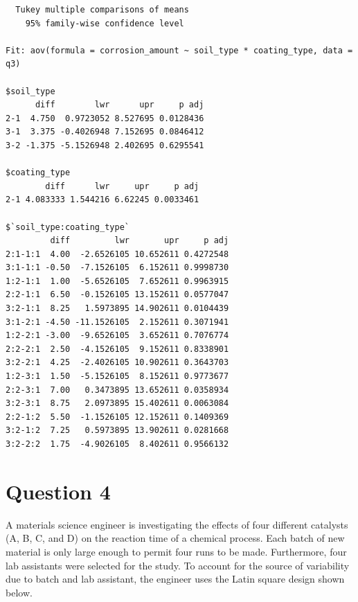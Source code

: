 \documentclass[
  a4paper]{article}
\begin{document}
\begin{verbatim}
  Tukey multiple comparisons of means
    95% family-wise confidence level

Fit: aov(formula = corrosion_amount ~ soil_type * coating_type, data = q3)

$soil_type
      diff        lwr      upr     p adj
2-1  4.750  0.9723052 8.527695 0.0128436
3-1  3.375 -0.4026948 7.152695 0.0846412
3-2 -1.375 -5.1526948 2.402695 0.6295541

$coating_type
        diff      lwr     upr     p adj
2-1 4.083333 1.544216 6.62245 0.0033461

$`soil_type:coating_type`
         diff         lwr       upr     p adj
2:1-1:1  4.00  -2.6526105 10.652611 0.4272548
3:1-1:1 -0.50  -7.1526105  6.152611 0.9998730
1:2-1:1  1.00  -5.6526105  7.652611 0.9963915
2:2-1:1  6.50  -0.1526105 13.152611 0.0577047
3:2-1:1  8.25   1.5973895 14.902611 0.0104439
3:1-2:1 -4.50 -11.1526105  2.152611 0.3071941
1:2-2:1 -3.00  -9.6526105  3.652611 0.7076774
2:2-2:1  2.50  -4.1526105  9.152611 0.8338901
3:2-2:1  4.25  -2.4026105 10.902611 0.3643703
1:2-3:1  1.50  -5.1526105  8.152611 0.9773677
2:2-3:1  7.00   0.3473895 13.652611 0.0358934
3:2-3:1  8.75   2.0973895 15.402611 0.0063084
2:2-1:2  5.50  -1.1526105 12.152611 0.1409369
3:2-1:2  7.25   0.5973895 13.902611 0.0281668
3:2-2:2  1.75  -4.9026105  8.402611 0.9566132
\end{verbatim}

\section{Question 4}\label{question-4}

A materials science engineer is investigating the effects of four
different catalysts (A, B, C, and D) on the reaction time of a chemical
process. Each batch of new material is only large enough to permit four
runs to be made. Furthermore, four lab assistants were selected for the
study. To account for the source of variability due to batch and lab
assistant, the engineer uses the Latin square design shown below.
\end{document}
